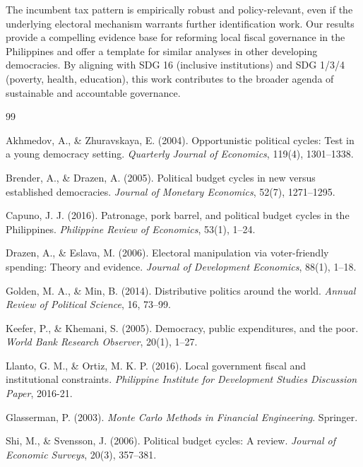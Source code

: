 \documentclass[twocolumn]{article}
\begin{document}
The incumbent tax pattern is empirically robust and policy-relevant, even if the underlying electoral mechanism warrants further identification work. Our results provide a compelling evidence base for reforming local fiscal governance in the Philippines and offer a template for similar analyses in other developing democracies. By aligning with SDG 16 (inclusive institutions) and SDG 1/3/4 (poverty, health, education), this work contributes to the broader agenda of sustainable and accountable governance.

\clearpage

\begin{thebibliography}{99}

Akhmedov, A., \& Zhuravskaya, E. (2004). Opportunistic political cycles: Test in a young democracy setting. \emph{Quarterly Journal of Economics}, 119(4), 1301--1338.

Brender, A., \& Drazen, A. (2005). Political budget cycles in new versus established democracies. \emph{Journal of Monetary Economics}, 52(7), 1271--1295.

Capuno, J. J. (2016). Patronage, pork barrel, and political budget cycles in the Philippines. \emph{Philippine Review of Economics}, 53(1), 1--24.

Drazen, A., \& Eslava, M. (2006). Electoral manipulation via voter-friendly spending: Theory and evidence. \emph{Journal of Development Economics}, 88(1), 1--18.

Golden, M. A., \& Min, B. (2014). Distributive politics around the world. \emph{Annual Review of Political Science}, 16, 73--99.

Keefer, P., \& Khemani, S. (2005). Democracy, public expenditures, and the poor. \emph{World Bank Research Observer}, 20(1), 1--27.

Llanto, G. M., \& Ortiz, M. K. P. (2016). Local government fiscal and institutional constraints. \emph{Philippine Institute for Development Studies Discussion Paper}, 2016-21.

Glasserman, P. (2003). \emph{Monte Carlo Methods in Financial Engineering}. Springer.

Shi, M., \& Svensson, J. (2006). Political budget cycles: A review. \emph{Journal of Economic Surveys}, 20(3), 357--381.


\end{thebibliography}
\end{document}
